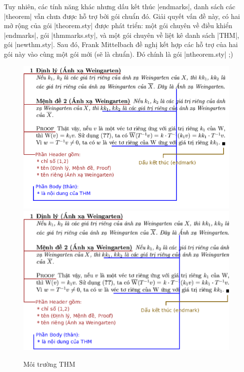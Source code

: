 \documentclass[11pt,oneside]{ltxdoc}
\theoremstyle{marginbreak}
\theoremstyle{changebreak}
\theoremstyle{change}
\theoremstyle{plain}
\theoremstyle{nonumberplain}
\begin{document}
\medskip
Tuy nhiên, các tính năng khác nhưng dấu kết thúc |endmarks|, danh sách
các |theorem| vẫn chưa được hỗ trợ bởi gói chuẩn đó. Giải quyết vấn đề này,
có hai mở rộng của gói |theorem.sty| được phát triển: một gói chuyên về
điều khiển |endmarks|, gói |thmmarks.sty|, và một gói chuyên về liệt
kê danh sách |THM|, gói |newthm.sty|. Sau đó, Frank Mittelbach đề nghị
kết hợp các hỗ trợ của hai gói này vào cùng một gói mới (sẽ là chuẩn).
Đó chính là gói |ntheorem.sty| ;)

\begin{figure}[bht]
\begin{center}
	\ifpdf
		\includegraphics[scale=.6]{thm.png}
	\else
		\includegraphics[scale=.6]{thm.ps}
	\fi
\end{center}
\caption{Môi trường THM}
\label{fig:THM}
\end{figure}
\end{document}
